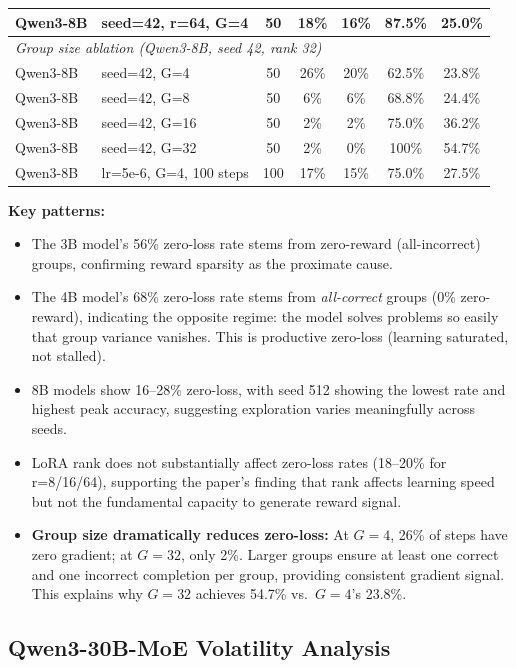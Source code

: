 \documentclass{article}
\begin{document}
\begin{table}[htbp]
\begin{tabular}{llccccc}
        Qwen3-8B & seed=42, r=64, G=4 & 50 & 18\% & 16\% & 87.5\% & 25.0\% \\
        \midrule
        \multicolumn{7}{l}{\emph{Group size ablation (Qwen3-8B, seed 42, rank 32)}} \\
        Qwen3-8B & seed=42, G=4 & 50 & 26\% & 20\% & 62.5\% & 23.8\% \\
        Qwen3-8B & seed=42, G=8 & 50 & 6\% & 6\% & 68.8\% & 24.4\% \\
        Qwen3-8B & seed=42, G=16 & 50 & 2\% & 2\% & 75.0\% & 36.2\% \\
        Qwen3-8B & seed=42, G=32 & 50 & 2\% & 0\% & 100\% & 54.7\% \\
        \midrule
        Qwen3-8B & lr=5e-6, G=4, 100 steps & 100 & 17\% & 15\% & 75.0\% & 27.5\% \\
        \bottomrule
    \end{tabular}
    \label{tab:zero_loss_comprehensive}
\end{table}

\textbf{Key patterns:}
\begin{itemize}
    \item The 3B model's 56\% zero-loss rate stems from zero-reward (all-incorrect) groups, confirming reward sparsity as the proximate cause.
    \item The 4B model's 68\% zero-loss rate stems from \emph{all-correct} groups (0\% zero-reward), indicating the opposite regime: the model solves problems so easily that group variance vanishes. This is productive zero-loss (learning saturated, not stalled).
    \item 8B models show 16--28\% zero-loss, with seed 512 showing the lowest rate and highest peak accuracy, suggesting exploration varies meaningfully across seeds.
    \item LoRA rank does not substantially affect zero-loss rates (18--20\% for r=8/16/64), supporting the paper's finding that rank affects learning speed but not the fundamental capacity to generate reward signal.
    \item \textbf{Group size dramatically reduces zero-loss:} At $G{=}4$, 26\% of steps have zero gradient; at $G{=}32$, only 2\%. Larger groups ensure at least one correct and one incorrect completion per group, providing consistent gradient signal. This explains why $G{=}32$ achieves 54.7\% vs.\ $G{=}4$'s 23.8\%.
\end{itemize}

\subsection{Qwen3-30B-MoE Volatility Analysis}
\end{document}
